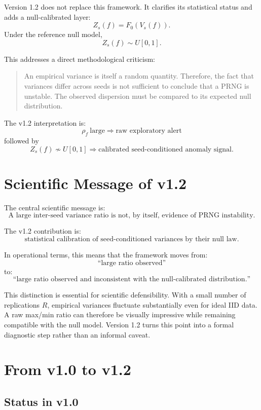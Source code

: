 \documentclass[11pt,a4paper]{article}
\begin{document}
Version 1.2 does not replace this framework. It clarifies its statistical status and adds a null-calibrated layer:
\[
\boxed{
Z_s(f)=F_0(V_s(f)).
}
\]
Under the reference null model,
\[
\boxed{
Z_s(f)\sim U[0,1].
}
\]

This addresses a direct methodological criticism:
\begin{quote}
An empirical variance is itself a random quantity. Therefore, the fact that variances differ across seeds is not sufficient to conclude that a PRNG is unstable. The observed dispersion must be compared to its expected null distribution.
\end{quote}

The v1.2 interpretation is:
\[
\boxed{
\rho_f\ \text{large} \Rightarrow \text{raw exploratory alert}
}
\]
followed by
\[
\boxed{
Z_s(f)\not\sim U[0,1] \Rightarrow \text{calibrated seed-conditioned anomaly signal}.
}
\]

\section{Scientific Message of v1.2}

The central scientific message is:
\[
\boxed{
\text{A large inter-seed variance ratio is not, by itself, evidence of PRNG instability.}
}
\]

The v1.2 contribution is:
\[
\boxed{
\text{statistical calibration of seed-conditioned variances by their null law.}
}
\]

In operational terms, this means that the framework moves from:
\[
\text{``large ratio observed''}
\]
to:
\[
\text{``large ratio observed and inconsistent with the null-calibrated distribution.''}
\]

This distinction is essential for scientific defensibility. With a small number of replications \(R\), empirical variances fluctuate substantially even for ideal IID data. A raw max/min ratio can therefore be visually impressive while remaining compatible with the null model. Version 1.2 turns this point into a formal diagnostic step rather than an informal caveat.

\section{From v1.0 to v1.2}

\subsection{Status in v1.0}
\end{document}
